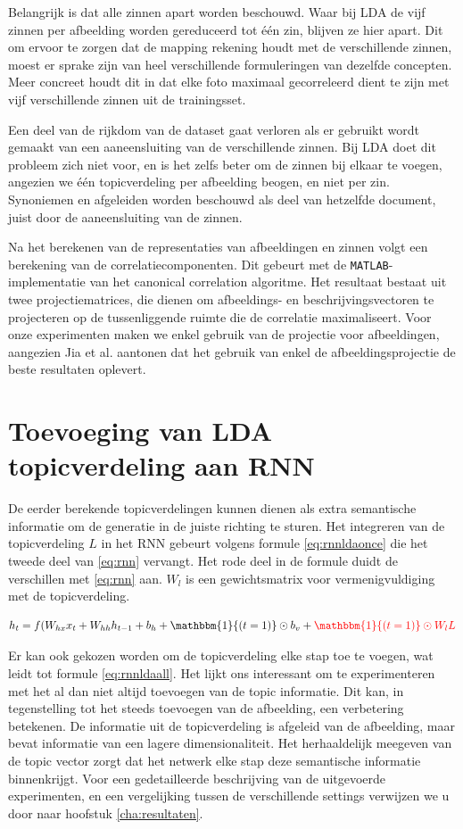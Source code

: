 Belangrijk is dat alle zinnen apart worden beschouwd. Waar bij LDA de vijf zinnen per afbeelding worden gereduceerd tot \'e\'en zin, blijven ze hier apart. Dit om ervoor te zorgen dat de mapping rekening houdt met de verschillende zinnen, moest er sprake zijn van heel verschillende formuleringen van dezelfde concepten. Meer concreet houdt dit in dat elke foto maximaal gecorreleerd dient te zijn met vijf verschillende zinnen uit de trainingsset.

Een deel van de rijkdom van de dataset gaat verloren als er gebruikt wordt gemaakt van een aaneensluiting van de verschillende zinnen. Bij LDA doet dit probleem zich niet voor, en is het zelfs beter om de zinnen bij elkaar te voegen, angezien we \'e\'en topicverdeling per afbeelding beogen, en niet per zin. Synoniemen en afgeleiden worden beschouwd als deel van hetzelfde document, juist door de aaneensluiting van de zinnen.

Na het berekenen van de representaties van afbeeldingen en zinnen volgt een berekening van de correlatiecomponenten. Dit gebeurt met de \texttt{MATLAB}-implementatie van het canonical correlation algoritme. Het resultaat bestaat uit twee projectiematrices, die dienen om afbeeldings- en beschrijvingsvectoren te projecteren op de tussenliggende ruimte die de correlatie maximaliseert. Voor onze experimenten maken we enkel gebruik van de projectie voor afbeeldingen, aangezien Jia et al.\cite{Fernando2015} aantonen dat het gebruik van enkel de afbeeldingsprojectie de beste resultaten oplevert.


\section{Toevoeging van LDA topicverdeling aan RNN}
De eerder berekende topicverdelingen kunnen dienen als extra semantische informatie om de generatie in de juiste richting te sturen. Het integreren van de topicverdeling $L$ in het RNN gebeurt volgens formule \eqref{eq:rnnldaonce} die het tweede deel van \eqref{eq:rnn} vervangt. Het rode deel in de formule duidt de verschillen met \eqref{eq:rnn} aan. $W_l$ is een gewichtsmatrix voor vermenigvuldiging met de topicverdeling.

\begin{equation}
    h_t = f(W_{hx} x_{t} + W_{hh} h_{t-1} + b_h + \mathbbm{1}{(t=1)} \odot b_v +\color{red}{\mathbbm{1}{(t=1)} \odot W_lL}
    \color{black}
    \label{eq:rnnldaonce}
\end{equation}

Er kan ook gekozen worden om de topicverdeling elke stap toe te voegen, wat leidt tot formule \eqref{eq:rnnldaall}. Het lijkt ons interessant om te experimenteren met het al dan niet altijd toevoegen van de topic informatie. Dit kan, in tegenstelling tot het steeds toevoegen van de afbeelding, een verbetering betekenen. De informatie uit de topicverdeling is afgeleid van de afbeelding, maar bevat informatie van een lagere dimensionaliteit. Het herhaaldelijk meegeven van de topic vector zorgt dat het netwerk elke stap deze semantische informatie binnenkrijgt. Voor een gedetailleerde beschrijving van de uitgevoerde experimenten, en een vergelijking tussen de verschillende settings verwijzen we u door naar hoofstuk \ref{cha:resultaten}.


